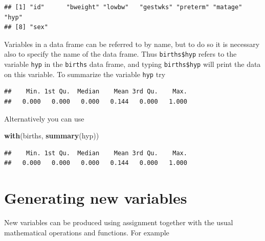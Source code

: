 \documentclass[
]{book}
\newenvironment{Shaded}{\begin{snugshade}}{\end{snugshade}}
\newcommand{\FunctionTok}[1]{\textcolor[rgb]{0.13,0.29,0.53}{\textbf{#1}}}
\newcommand{\NormalTok}[1]{#1}
\newcommand{\OtherTok}[1]{\textcolor[rgb]{0.56,0.35,0.01}{#1}}
\newcommand{\SpecialCharTok}[1]{\textcolor[rgb]{0.81,0.36,0.00}{\textbf{#1}}}
\begin{document}
\begin{verbatim}
## [1] "id"      "bweight" "lowbw"   "gestwks" "preterm" "matage"  "hyp"    
## [8] "sex"
\end{verbatim}

Variables in a data frame can be referred to by name, but to do so
it is necessary also to specify the name of the data frame. Thus
\texttt{births\$hyp} refers to the variable \texttt{hyp} in the \texttt{births}
data frame, and typing \texttt{births\$hyp} will print the data on this
variable. To summarize the variable \texttt{hyp} try

\begin{Shaded}
\end{Shaded}

\begin{verbatim}
##    Min. 1st Qu.  Median    Mean 3rd Qu.    Max. 
##   0.000   0.000   0.000   0.144   0.000   1.000
\end{verbatim}

Alternatively you can use

\begin{Shaded}
\begin{Highlighting}[]
\FunctionTok{with}\NormalTok{(births, }\FunctionTok{summary}\NormalTok{(hyp))}
\end{Highlighting}
\end{Shaded}

\begin{verbatim}
##    Min. 1st Qu.  Median    Mean 3rd Qu.    Max. 
##   0.000   0.000   0.000   0.144   0.000   1.000
\end{verbatim}

\section{Generating new variables}\label{generating-new-variables}

New variables can be produced using assignment together with the usual
mathematical operations and functions. For example

\begin{Shaded}
\end{Shaded}
\end{document}
